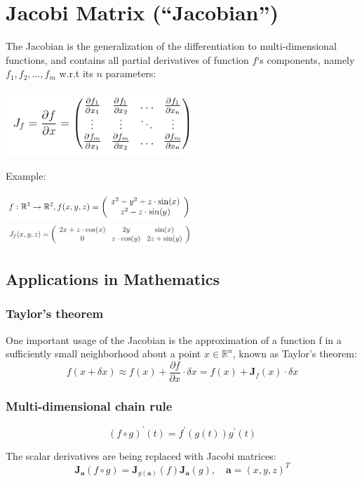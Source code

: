 \section{Jacobi Matrix (``Jacobian'')}

The Jacobian is the generalization of the differentiation to multi-dimensional functions, and contains all partial derivatives of function $ f $`s components, namely $ f_1 , f_2 , ..., f_{m} $ w.r.t its $ n $ parameters:

\begin{center}
\includegraphics[width=7cm]{sections/imgs/39.png}
\end{center}
Example:
\begin{center}
\includegraphics[width=7cm]{sections/imgs/40.png}
\includegraphics[width=7cm]{sections/imgs/41.png}
\end{center}

\subsection{Applications in Mathematics}
\subsubsection{Taylor's theorem}
One important usage of the Jacobian is the approximation of a function f in a sufficiently small neighborhood about a point $ x \in \mathbb{R}^{n} $, known as Taylor’s theorem:
\[ f (x + \delta x) \approx f (x) + \frac{\partial f}{\partial x} \cdot \delta x =  f (x) + \mathbf{J}_{f} (x) \cdot \delta x \]

\subsubsection{Multi-dimensional chain rule}
\[ (f \circ g)^{'} (t) = f^{'} (g (t)) g^{'} (t) \] 

The scalar derivatives are being replaced with Jacobi matrices: 
\[\mathbf{J_{a}} (f \circ g) = \mathbf{J}_{g (\mathbf{a})} (f) \mathbf{J_{a}} (g), \quad \mathbf{a} = (x,y,z)^T \]

